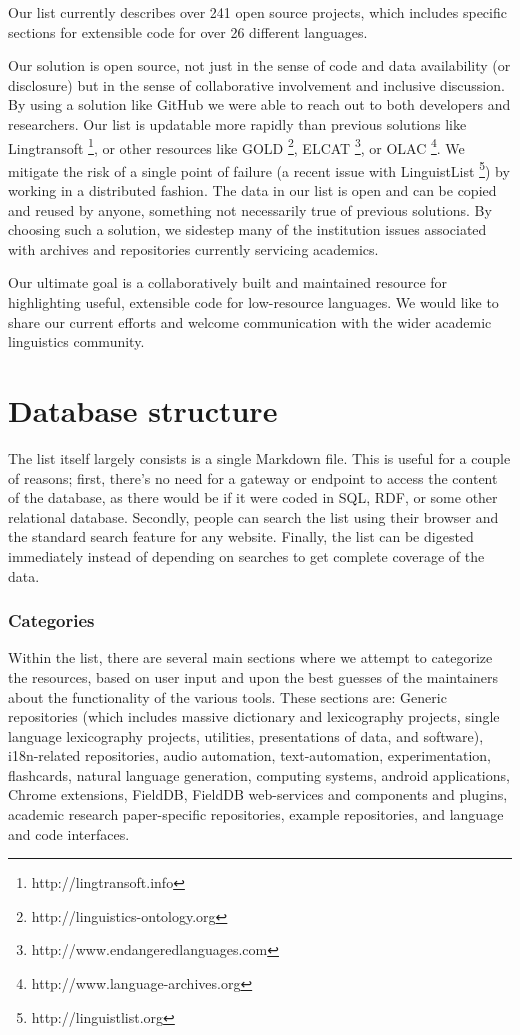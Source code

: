 \documentclass[10pt, a4paper]{article}
\begin{document}
Our list currently describes over 241 open source projects, which includes specific sections for extensible code for over 26 different languages.

Our solution is open source, not just in the sense of code and data availability (or disclosure) but
in the sense of collaborative involvement and inclusive discussion. By using a solution like
GitHub we were able to reach out to both developers and researchers. Our list is updatable more rapidly than previous solutions like Lingtransoft \footnote{http://lingtransoft.info}, or other resources like GOLD \footnote{http://linguistics-ontology.org}, ELCAT \footnote{http://www.endangeredlanguages.com}, or OLAC \footnote{http://www.language-archives.org}. We mitigate the risk of a single point of failure (a recent issue with LinguistList \footnote{http://linguistlist.org}) by working in a distributed fashion. The data in our list is open and can be copied and reused by anyone, something not necessarily true of previous solutions. By choosing such a solution, we sidestep many of the institution issues associated with archives and repositories currently servicing academics.

Our ultimate goal is a collaboratively built and maintained resource for highlighting
useful, extensible code for low-resource languages. We would like to share our current efforts
and welcome communication with the wider academic linguistics community.

\section{Database structure}

The list itself largely consists is a single Markdown file. This is useful for a couple of reasons; first, there's no need for a gateway or endpoint to access the content of the database, as there would be if it were coded in SQL, RDF, or some other relational database. Secondly, people can search the list using their browser and the standard search feature for any website. Finally, the list can be digested immediately instead of depending on searches to get complete coverage of the data. 

\subsubsection{Categories}

Within the list, there are several main sections where we attempt to categorize the resources, based on user input and upon the best guesses of the maintainers about the functionality of the various tools. These sections are: Generic repositories (which includes massive dictionary and lexicography projects, single language lexicography projects, utilities, presentations of data, and software), i18n-related repositories, audio automation, text-automation, experimentation, flashcards, natural language generation, computing systems, android applications, Chrome extensions, FieldDB, FieldDB web-services and components and plugins, academic research paper-specific repositories, example repositories, and language  and code interfaces. 
\end{document}
